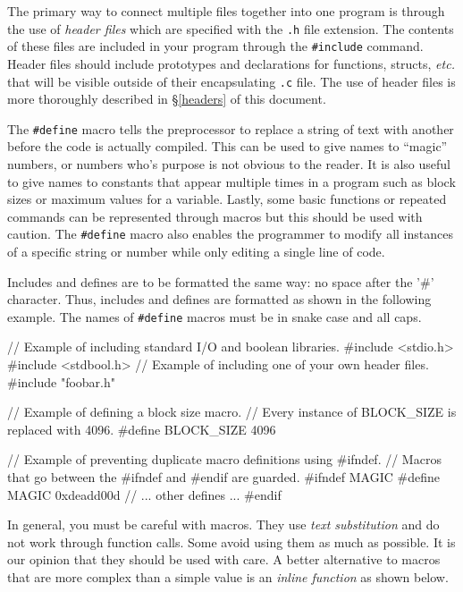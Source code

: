 \documentclass[11pt]{article}
\begin{document}
The primary way to connect multiple files together into one program is through
the use of \emph{header files} which are specified with the \texttt{.h} file
extension. The contents of these files are included in your program through the
\texttt{\#include} command. Header files should include prototypes and
declarations for functions, structs, \emph{etc.} that will be visible outside of
their encapsulating \texttt{.c} file. The use of header files is more thoroughly
described in \S \ref{headers} of this document.

The \texttt{\#define} macro tells the preprocessor to replace a string of text
with another before the code is actually compiled. This can be used to give
names to ``magic'' numbers, or numbers who's purpose is not obvious to the
reader.  It is also useful to give names to constants that appear multiple times
in a program such as block sizes or maximum values for a variable. Lastly, some
basic functions or repeated commands can be represented through macros but this
should be used with caution. The \texttt{\#define} macro also enables the
programmer to modify all instances of a specific string or number while only
editing a single line of code.

Includes and defines are to be formatted the same way: no space after the '\#'
character. Thus, includes and defines are formatted as shown in the following
example. The names of \texttt{\#define} macros must be in snake case and all
caps.

\begin{codelisting}{}
// Example of including standard I/O and boolean libraries.
#include <stdio.h>
#include <stdbool.h>
// Example of including one of your own header files.
#include "foobar.h"

// Example of defining a block size macro.
// Every instance of BLOCK_SIZE is replaced with 4096.
#define BLOCK_SIZE 4096

// Example of preventing duplicate macro definitions using #ifndef.
// Macros that go between the #ifndef and #endif are guarded.
#ifndef MAGIC
#define MAGIC 0xdeadd00d
// ... other defines ...
#endif
\end{codelisting}

In general, you must be careful with macros. They use \emph{text substitution}
and do not work through function calls. Some avoid using them as much as
possible. It is our opinion that they should be used with care. A better
alternative to macros that are more complex than a simple value is an
\emph{inline function} as shown below.
\end{document}
